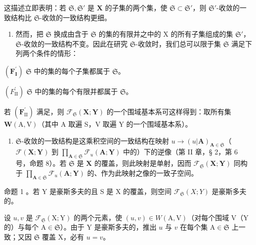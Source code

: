 这描述立即表明：若 \(\mathfrak{S},\mathfrak{S}'\) 是 \(\mathbf{X}\) 的子集的两个集，使 \(\mathfrak{S} \subset \mathfrak{S}'\)，则 \(\mathfrak{S}'\)-收敛的一致结构比 \(\mathfrak{S}\)-收敛的一致结构更细。

\begin{enumerate}
\def\labelenumi{\arabic{enumi})}
\setcounter{enumi}{1}
\tightlist
\item
  然而，把 \(\mathfrak{S}\) 换成由含于 \(\mathfrak{S}\) 的集的有限并之中的 X 的所有子集组成的集 \(\mathfrak{S}'\)，\(\mathfrak{S}\)-收敛的一致结构不变。因此在研究 \(\mathfrak{S}\)-收敛时，我们总可以限于集 \(\mathfrak{S}\) 满足下列两个条件的情形：
\end{enumerate}

\((\mathbf{F}_{\mathbf{I}}^{\prime})\) \(\mathfrak{S}\) 中的集的每个子集都属于 \(\mathfrak{S}\)。

\((F_{\mathrm{II}}^{\prime})\) \(\mathfrak{S}\) 中的集的每个有限并都属于 \(\mathfrak{S}\)。

若 \((\mathbf{F}_{\mathrm{II}}^{\prime})\) 满足，则 \(\mathcal{F}_{\mathfrak{S}}(\mathbf{X};\mathbf{Y})\) 的一个围域基本系可这样得到：取所有集 \(\boldsymbol{W}(\mathrm{A},\mathrm{V})\)（其中 A 取遍 S，V 取遍 Y 的一个围域基本系）。

\begin{enumerate}
\def\labelenumi{\arabic{enumi})}
\setcounter{enumi}{2}
\tightlist
\item
  \(\mathfrak{S}\)-收敛的一致结构是这乘积空间的一致结构在映射 \(u \to (u|\mathbf{A})_{\mathbf{A} \in \mathfrak{S}}\)（\(\mathcal{F}(\mathbf{X}; \mathbf{Y})\) 到 \(\prod_{\mathbf{A} \in \mathfrak{S}} \mathcal{F}_u(\mathbf{A}; \mathbf{Y})\) 中的）下的逆像（第 II 章，§ 2，第 6 号，命题 8）。若 \(\mathfrak{S}\) 是 \(\mathbf{X}\) 的覆盖，则此映射是单射，因而 \(\mathcal{F}_{\mathfrak{S}}(\mathbf{X}; \mathbf{Y})\) 同构于 \(\prod_{\mathbf{A} \in \mathfrak{S}} \mathcal{F}_u(\mathbf{A}; \mathbf{Y})\) 的、作为此映射之像的一致子空间。
\end{enumerate}

命题 1 。若 Y 是豪斯多夫的且 S 是 X 的覆盖，则空间 \(\mathcal{F}_{\mathfrak{S}}(X;Y)\) 是豪斯多夫的。

设 \(u, v\) 是 \(\mathcal{F}_{\mathfrak{S}}(\mathrm{X}; \mathrm{Y})\) 的两个元素，使 \((u, v) \in W(\mathrm{A}, \mathrm{V})\)（对每个围域 \(\mathrm{V}\)（\(\mathrm{Y}\) 的）与每个 \(\mathrm{A} \in \mathfrak{S}\)）。由于 \(\mathrm{Y}\) 是豪斯多夫的，推出 \(u\) 与 \(v\) 在每个集 \(\mathrm{A} \in \mathfrak{S}\) 上一致；又因 \(\mathfrak{S}\) 覆盖 \(\mathrm{X}\)，必有 \(u = v\)。

